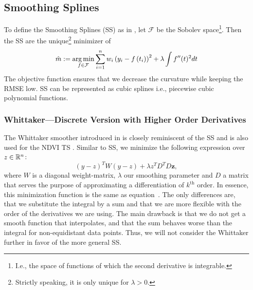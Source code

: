 	\subsection{Smoothing Splines}
		\label{sec:Natural_SS}
		To define the Smoothing Splines (SS) as in \cite{cravenSmoothingNoisyData1978}, let $\mathcal F$ be the Sobolev space\footnote{I.e., the space of functions of which the second derivative is integrable.}. Then the SS are the unique\footnote{Strictly speaking, it is only unique for $\lambda > 0$.} minimizer of
		\begin{equation}
			\label{eq:ss}
			\hat m :=\operatorname*{arg\, min}_{f \in \mathcal F} \sum_{i=1}^{n}w_i\left(y_{i}-{f}\left(t_{i}\right)\right)^{2}+\lambda \int {f}^{\prime \prime}(t)^{2} dt
		\end{equation}
		 The objective function ensures that we decrease the curvature while keeping the RMSE low.
		SS can be represented as cubic splines i.e., piecewise cubic polynomial functions.

		\subsubsection{Whittaker---Discrete Version with Higher Order Derivatives}
			The Whittaker smoother introduced in \cite{eilersPerfectSmoother2003} is closely reminiscent of the SS and is also used for the NDVI TS \citep{atzbergerTimeSeriesMonitoring2011}. Similar to SS, we minimize the following expression over $z\in \mathbb{R}^n$:
			$$
			({y}-{z})^{{T}} {W}({y}-{z})+\lambda {z}^{{T}} {D}^{{T}} {D} \mathbf{z},
			$$
			where $W$ is a diagonal weight-matrix, $\lambda$ our smoothing parameter and $D$ a matrix that serves the purpose of approximating a differentiation of $k^\text{th}$ order. In essence, this minimization function is the same as equation~. The only differences are, that we substitute the integral by a sum and that we are more flexible with the order of the derivatives we are using. The main drawback is that we do not get a smooth function that interpolates, and that the sum behaves worse than the integral for non-equidistant data points. Thus, we will not consider the Whittaker further in favor of the more general SS. 

